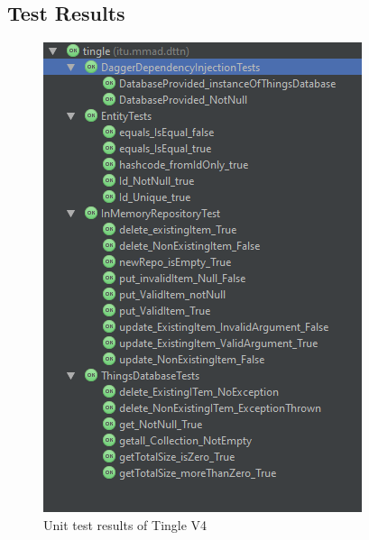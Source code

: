 \documentclass{article}
\begin{document}
\subsection{Test Results}
\begin{figure}[h!]
	\centering
	\includegraphics[scale=0.8]{"testResultsV4"}
	\caption{Unit test results of Tingle V4}
	\label{fig:testResultsV4}
\end{figure}


\pagebreak
\end{document}
